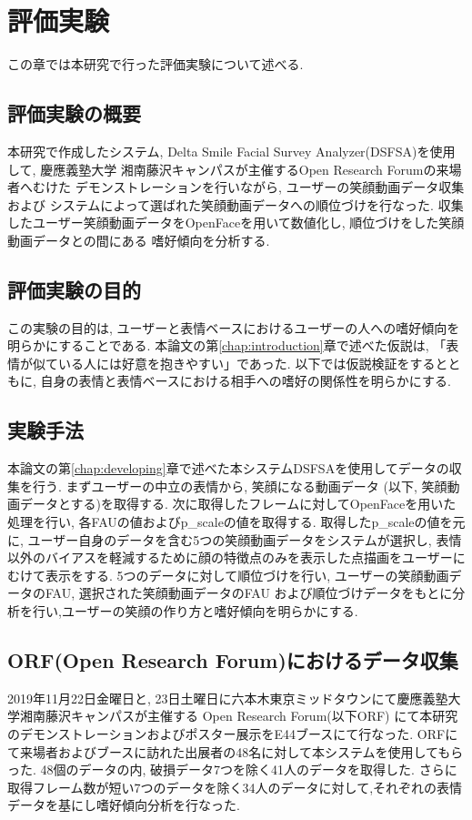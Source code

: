 \chapter{評価実験}
\label{chap:main_experiment}

この章では本研究で行った評価実験について述べる.

\section{評価実験の概要}
本研究で作成したシステム, Delta Smile Facial Survey Analyzer(DSFSA)を使用して,
慶應義塾大学 湘南藤沢キャンパスが主催するOpen Research Forumの来場者へむけた
デモンストレーションを行いながら, ユーザーの笑顔動画データ収集および
システムによって選ばれた笑顔動画データへの順位づけを行なった.
収集したユーザー笑顔動画データをOpenFaceを用いて数値化し, 順位づけをした笑顔動画データとの間にある
嗜好傾向を分析する.

\section{評価実験の目的}
この実験の目的は, ユーザーと表情ベースにおけるユーザーの人への嗜好傾向を明らかにすることである.
本論文の第\ref{chap:introduction}章で述べた仮説は, 「表情が似ている人には好意を抱きやすい」であった.
以下では仮説検証をするとともに, 自身の表情と表情ベースにおける相手への嗜好の関係性を明らかにする.

\section{実験手法}
本論文の第\ref{chap:developing}章で述べた本システムDSFSAを使用してデータの収集を行う.
まずユーザーの中立の表情から, 笑顔になる動画データ (以下, 笑顔動画データとする)を取得する.
次に取得したフレームに対してOpenFaceを用いた処理を行い, 各FAUの値およびp\_scaleの値を取得する.
取得したp\_scaleの値を元に, ユーザー自身のデータを含む5つの笑顔動画データをシステムが選択し,
表情以外のバイアスを軽減するために顔の特徴点のみを表示した点描画をユーザーにむけて表示をする.
5つのデータに対して順位づけを行い, ユーザーの笑顔動画データのFAU, 選択された笑顔動画データのFAU
および順位づけデータをもとに分析を行い,ユーザーの笑顔の作り方と嗜好傾向を明らかにする.

\section{ORF(Open Research Forum)におけるデータ収集}
2019年11月22日金曜日と, 23日土曜日に六本木東京ミッドタウンにて慶應義塾大学湘南藤沢キャンパスが主催する
Open Research Forum(以下ORF) にて本研究のデモンストレーションおよびポスター展示をE44ブースにて行なった.
ORFにて来場者およびブースに訪れた出展者の48名に対して本システムを使用してもらった.
48個のデータの内, 破損データ7つを除く41人のデータを取得した.
さらに取得フレーム数が短い7つのデータを除く34人のデータに対して,それぞれの表情データを基にし嗜好傾向分析を行なった.

